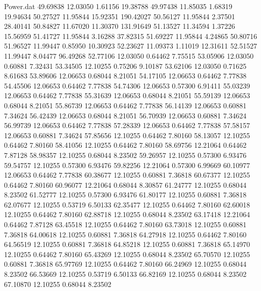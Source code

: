 \begin{filecontents}{Power.dat}
  49.69838   12.03050    1.61156   19.38788
  49.97438   11.85035    1.68319   19.94634
  50.27527   11.95844   15.92351  190.42027
  50.56127   11.95844    2.37501   28.40141
  50.84827   11.67020   11.30370  131.91649
  51.13527   11.34594    1.37226   15.56959
  51.41727   11.95844    3.16288   37.82315
  51.69227   11.95844    4.24865   50.80716
  51.96527   11.99447    0.85950   10.30923
  52.23627   11.09373    1.11019   12.31611
  52.51527   11.99447    8.04477   96.49268
  52.77106   12.03050    0.64462    7.75515
  53.05906   12.03050    0.60881    7.32431
  53.34505   12.10255    0.75206    9.10187
  53.62106   12.03050    0.71625    8.61683
  53.89606   12.06653    0.68044    8.21051
  54.17105   12.06653    0.64462    7.77838
  54.45506   12.06653    0.64462    7.77838
  54.74306   12.06653    0.57300    6.91411
  55.03239   12.06653    0.64462    7.77838
  55.31639   12.06653    0.68044    8.21051
  55.59139   12.06653    0.68044    8.21051
  55.86739   12.06653    0.64462    7.77838
  56.14139   12.06653    0.60881    7.34624
  56.42439   12.06653    0.68044    8.21051
  56.70939   12.06653    0.60881    7.34624
  56.99739   12.06653    0.64462    7.77838
  57.28339   12.06653    0.64462    7.77838
  57.58157   12.06653    0.60881    7.34624
  57.85656   12.10255    0.64462    7.80160
  58.13057   12.10255    0.64462    7.80160
  58.41056   12.10255    0.64462    7.80160
  58.69756   12.21064    0.64462    7.87128
  58.98357   12.10255    0.68044    8.23502
  59.26957   12.10255    0.57300    6.93476
  59.54757   12.10255    0.57300    6.93476
  59.82256   12.21064    0.57300    6.99669
  60.10977   12.06653    0.64462    7.77838
  60.38677   12.10255    0.60881    7.36818
  60.67377   12.10255    0.64462    7.80160
  60.96077   12.21064    0.68044    8.30857
  61.24777   12.10255    0.68044    8.23502
  61.52777   12.10255    0.57300    6.93476
  61.80177   12.10255    0.60881    7.36818
  62.07677   12.10255    0.53719    6.50133
  62.35477   12.10255    0.64462    7.80160
  62.60018   12.10255    0.64462    7.80160
  62.88718   12.10255    0.68044    8.23502
  63.17418   12.21064    0.64462    7.87128
  63.45518   12.10255    0.64462    7.80160
  63.73018   12.10255    0.60881    7.36818
  64.00618   12.10255    0.60881    7.36818
  64.27918   12.10255    0.64462    7.80160
  64.56519   12.10255    0.60881    7.36818
  64.85218   12.10255    0.60881    7.36818
  65.14970   12.10255    0.64462    7.80160
  65.43269   12.10255    0.68044    8.23502
  65.70570   12.10255    0.60881    7.36818
  65.97769   12.10255    0.64462    7.80160
  66.24969   12.10255    0.68044    8.23502
  66.53669   12.10255    0.53719    6.50133
  66.82169   12.10255    0.68044    8.23502
  67.10870   12.10255    0.68044    8.23502
\end{filecontents}
